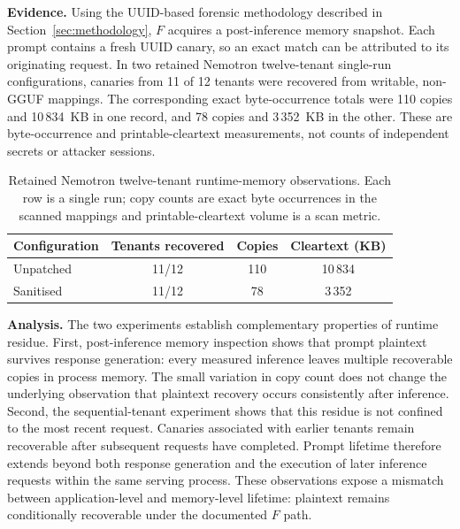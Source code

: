\documentclass[journal,tifs]{IEEEtran}
\begin{document}

{\bf Evidence.} Using the UUID-based forensic methodology described in
Section~\ref{sec:methodology}, $F$ acquires a post-inference memory
snapshot. Each prompt contains a fresh UUID canary, so an exact match can
be attributed to its originating request. In two retained Nemotron
twelve-tenant single-run configurations, canaries from 11 of 12 tenants were recovered
from writable, non-GGUF mappings. The corresponding exact byte-occurrence
totals were 110 copies and 10\,834~KB in one record, and 78 copies and
3\,352~KB in the other. These are byte-occurrence and printable-cleartext
measurements, not counts of independent secrets or attacker sessions.

\begin{table}[!t]
    \centering
    \caption{Retained Nemotron twelve-tenant runtime-memory observations.
    Each row is a single run; copy counts are exact byte occurrences in the
    scanned mappings and printable-cleartext volume is a scan metric.}
    \label{tab:residue}
    \footnotesize
    \setlength{\tabcolsep}{4pt}
    \begin{tabular}{@{}lccc@{}}
        \toprule
        Configuration & Tenants recovered & Copies & Cleartext (KB) \\
        \midrule
        Unpatched & 11/12 & 110 & 10\,834 \\
        Sanitised & 11/12 & 78 & 3\,352 \\
        \bottomrule
    \end{tabular}
\end{table}




{\bf Analysis.} The two experiments establish complementary properties of runtime
residue. First, post-inference memory inspection shows that prompt
plaintext survives response generation: every measured inference leaves
multiple recoverable copies in process memory. The small variation in
copy count does not change the underlying observation that plaintext
recovery occurs consistently after inference. Second, the sequential-tenant experiment shows that this residue is not
confined to the most recent request. Canaries associated with earlier
tenants remain recoverable after subsequent requests have completed.
Prompt lifetime therefore extends beyond both response generation and
the execution of later inference requests within the same serving
process. These observations expose a mismatch between application-level and
memory-level lifetime: plaintext remains conditionally recoverable under
the documented $F$ path.
\end{document}
